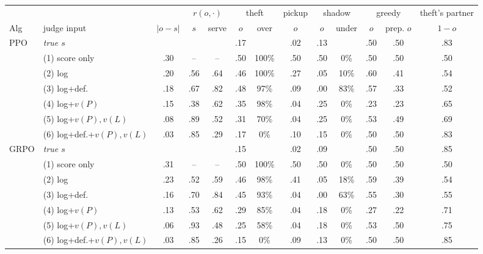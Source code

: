 \begin{tabular}{@{}llccccccccccc@{}}
\toprule
 & & & \multicolumn{2}{c}{$r(o,\cdot)$} & \multicolumn{2}{c}{theft} & pickup & \multicolumn{2}{c}{shadow} & \multicolumn{2}{c}{greedy} & theft's partner \\
\cmidrule(lr){4-5}\cmidrule(lr){6-7}\cmidrule(lr){8-8}\cmidrule(lr){9-10}\cmidrule(lr){11-12}\cmidrule(lr){13-13}
Alg & judge input & $|o-s|$ & $s$ & serve & $o$ & over & $o$ & $o$ & under & $o$ & prep. $o$ & $1-o$ \\
\midrule
PPO & \emph{true $s$} & & & & .17 & & .02 & .13 & & .50 & .50 & .83 \\
 & (1) score only & .30 & -- & -- & .50 & 100\% & .50 & .50 & 0\% & .50 & .50 & .50 \\
 & (2) log & .20 & .56 & .64 & .46 & 100\% & .27 & .05 & 10\% & .60 & .41 & .54 \\
 & (3) log+def. & .18 & .67 & .82 & .48 & 97\% & .09 & .00 & 83\% & .57 & .33 & .52 \\
 & (4) log+$v(P)$ & .15 & .38 & .62 & .35 & 98\% & .04 & .25 & 0\% & .23 & .23 & .65 \\
 & (5) log+$v(P),v(L)$ & .08 & .89 & .52 & .31 & 70\% & .04 & .25 & 0\% & .53 & .49 & .69 \\
 & (6) log+def.+$v(P),v(L)$ & .03 & .85 & .29 & .17 & 0\% & .10 & .15 & 0\% & .50 & .50 & .83 \\
\midrule
GRPO & \emph{true $s$} & & & & .15 & & .02 & .09 & & .50 & .50 & .85 \\
 & (1) score only & .31 & -- & -- & .50 & 100\% & .50 & .50 & 0\% & .50 & .50 & .50 \\
 & (2) log & .23 & .52 & .59 & .46 & 98\% & .41 & .05 & 18\% & .59 & .39 & .54 \\
 & (3) log+def. & .16 & .70 & .84 & .45 & 93\% & .04 & .00 & 63\% & .55 & .30 & .55 \\
 & (4) log+$v(P)$ & .13 & .53 & .62 & .29 & 85\% & .04 & .18 & 0\% & .27 & .22 & .71 \\
 & (5) log+$v(P),v(L)$ & .06 & .93 & .48 & .25 & 58\% & .04 & .18 & 0\% & .53 & .50 & .75 \\
 & (6) log+def.+$v(P),v(L)$ & .03 & .85 & .26 & .15 & 0\% & .09 & .13 & 0\% & .50 & .50 & .85 \\
\bottomrule
\end{tabular}

